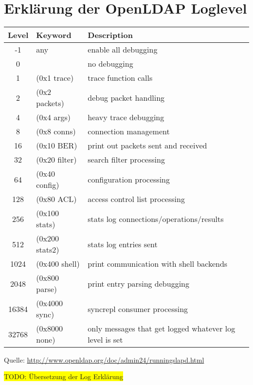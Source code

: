 \documentclass[11pt,a4paper,titlepage=firstiscover,headsepline,bibtotoc]{scrartcl} %
\newcommand{\hilight}[1]{\colorbox{yellow}{#1}} %
\begin{document}
\section{Erklärung der OpenLDAP Loglevel} \label{sec:LDAP-Loglevel}
\begin{tabularx}{\textwidth}{|c|l|X|}
\hline
Level &	Keyword &	Description\\
\hline
-1 &	any &	enable all debugging\\
\hline
0 &	  &	no debugging\\
\hline
1 &	(0x1 trace) &	trace function calls\\
\hline
2 &	(0x2 packets) &	debug packet handling\\
\hline
4 &	(0x4 args) &	heavy trace debugging\\
\hline
8 &	(0x8 conns)& 	connection management\\
\hline
16 &	(0x10 BER) & 	print out packets sent and received\\
\hline
32 &	(0x20 filter) &	search filter processing\\
\hline
64 &	(0x40 config) &	configuration processing\\
\hline
128 &	(0x80 ACL) &	access control list processing\\
\hline
256 &	(0x100 stats) &	stats log connections/operations/results\\
\hline
512 &	(0x200 stats2) &	stats log entries sent\\
\hline
1024 &	(0x400 shell) &	print communication with shell backends\\
\hline
2048 &	(0x800 parse) &	print entry parsing debugging\\
\hline
16384 &	(0x4000 sync) &	syncrepl consumer processing\\
\hline
32768 &	(0x8000 none) &	only messages that get logged whatever log level is set \\
\hline
\end{tabularx}
\noindent Quelle: \url{http://www.openldap.org/doc/admin24/runningslapd.html}

\noindent\hilight{TODO: Übersetzung der Log Erklärung}

\newpage
\end{document}
